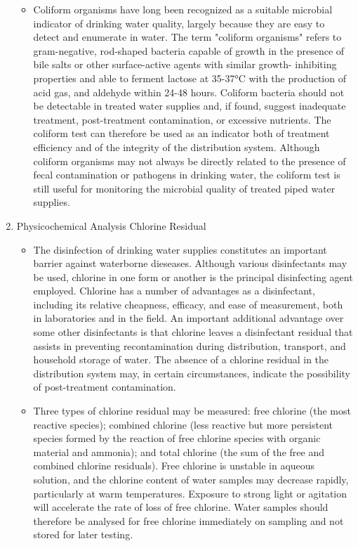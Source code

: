 \begin{enumerate}
\begin{itemize}
\item Coliform organisms have long been recognized as a suitable microbial indicator of drinking water quality, largely because they are easy to detect and enumerate in water. The term "coliform organisms" refers to gram-negative, rod-shaped bacteria capable of growth in the presence of bile salts or other surface-active agents with similar growth- inhibiting properties and able to ferment lactose at 35-37°C with the production of acid gas, and aldehyde within 24-48 hours. Coliform bacteria should not be detectable in treated water supplies and, if found, suggest inadequate treatment, post-treatment contamination, or excessive nutrients. The coliform test can therefore be used as an indicator both of treatment efficiency and of the integrity of the distribution system.
Although coliform organisms may not always be directly related to the presence of fecal contamination or pathogens in drinking water, the coliform test is still useful for monitoring the microbial quality of treated piped water supplies.
\end{itemize}



\item Physicochemical Analysis Chlorine Residual\\
\begin{itemize}
\item The disinfection of drinking water supplies constitutes an important barrier against waterborne dieseases. Although various disinfectants may be used, chlorine in one form or another is the principal disinfecting agent employed. Chlorine has a number of advantages as a disinfectant, including its relative cheapness, efficacy, and ease of measurement, both in laboratories and in the field. An important additional advantage over some other disinfectants is that chlorine leaves a disinfectant residual that assists in preventing recontamination during distribution, transport, and household storage of water. The absence of a chlorine residual in the distribution system may, in certain circumstances, indicate the possibility of post-treatment contamination.

\item Three types of chlorine residual may be measured: free chlorine (the most reactive species); combined chlorine (less reactive but more persistent species formed by the reaction of free chlorine species with organic material and ammonia); and total chlorine (the sum of the free and combined chlorine residuals). Free chlorine is unstable in aqueous solution, and the chlorine content of water samples may decrease rapidly, particularly at warm temperatures. Exposure to strong light or agitation will accelerate the rate of loss of free chlorine. Water samples should therefore be analysed for free chlorine immediately on sampling and not stored for later testing.
\end{itemize}




\end{enumerate}
